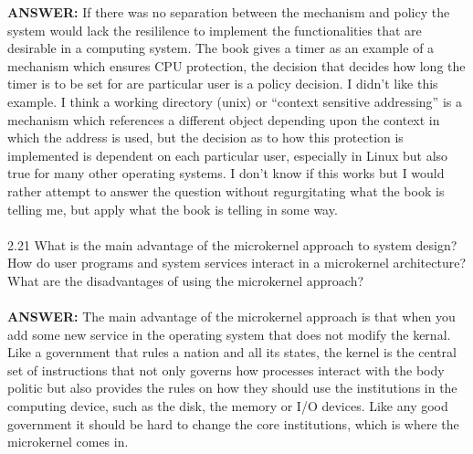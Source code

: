 \documentclass[12pt]{article}
\begin{document}
\textbf{ANSWER: }If there was no separation between the mechanism 
and policy the system would lack the resililence to implement the 
functionalities that are desirable in a computing system. The book 
gives a timer as an example of a mechanism which ensures CPU 
protection, the decision that decides how long the timer is 
to be set for are particular user is a policy decision. I didn't 
like this example. I think a working directory (unix) or ``context 
sensitive addressing'' is a mechanism which references a 
different object depending upon the context in which the 
address is used, but the decision as to how this protection 
is implemented is dependent on each particular user, especially in 
Linux but also true for many other operating systems. I don't know 
if this works but I would rather attempt to answer the question without 
regurgitating what the book is telling me, but apply what the 
book is telling in some way.
\\\\2.21 What is the main advantage of the microkernel approach to system
design? How do user programs and system services interact in a
microkernel architecture? What are the disadvantages of using the
microkernel approach?\\\\
\textbf{ANSWER: }The main advantage of the microkernel approach 
is that when you add some new service in the operating system that 
does not modify the kernal. Like a government that rules a nation 
and all its states, the kernel is the central set of instructions 
that not only governs how processes interact with the body politic 
but also provides the rules on how they should use the institutions 
in the computing device, such as the disk, the memory or I/O devices.
Like any good government it should be hard to change the core 
institutions, which is where the microkernel comes in.\\\\
\end{document}
